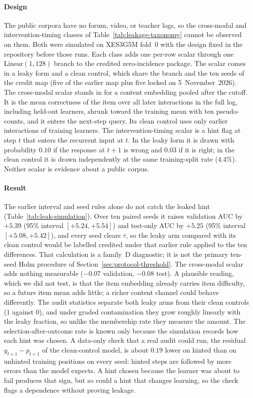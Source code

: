 \documentclass[review,12pt]{elsarticle}
\begin{document}
\paragraph{Design}
The public corpora have no forum, video, or teacher logs, so the
cross-modal and intervention-timing classes of
Table~\ref{tab:leakage-taxonomy} cannot be observed on them. Both were
simulated on XES3G5M fold~0 with the design fixed in the repository
before those runs. Each class adds one per-row scalar through one
$\mathrm{Linear}(1,128)$ branch to the credited zero-incidence package.
The scalar comes in a leaky form and a clean control, which share the
branch and the ten seeds of the credit map (five of the earlier map
plus five locked on 5~November~2026). The cross-modal scalar
stands in for a content embedding pooled after the cutoff. It is the
mean correctness of the item over all later interactions in the full
log, including held-out learners, shrunk toward the training mean with
ten pseudo-counts, and it enters the next-step query. Its clean control
uses only earlier interactions of training learners. The
intervention-timing scalar is a hint flag at step $t$ that enters the
recurrent input at $t$. In the leaky form it is drawn with probability
$0.10$ if the response at $t{+}1$ is wrong and $0.03$ if it is right;
in the clean control it is drawn independently at the same
training-split rate ($4.4\%$). Neither scalar is evidence about a
public corpus.

\paragraph{Result}
The earlier interval and seed rules alone do not catch the leaked hint
(Table~\ref{tab:leak-simulation}). Over ten paired seeds it raises
validation AUC by $+5.39$ (95\% interval $[+5.24,+5.54]$) and test-only
AUC by $+5.25$ (95\% interval $[+5.08,+5.42]$), and every seed clears
$\tau$, so the leaky arm compared with its clean control would be
labelled credited under that earlier rule applied to the ten
differences. That calculation is a family~D diagnostic; it is not the
primary ten-seed Holm procedure of Section~\ref{sec:protocol-threshold}. The cross-modal scalar adds
nothing measurable ($-0.07$ validation, $-0.08$ test). A plausible
reading, which we did not test, is that the item embedding already
carries item difficulty, so a future item mean adds little; a richer
content channel could behave differently. The audit statistics separate
both leaky arms from their clean controls ($1$ against $0$), and under graded
contamination they grow roughly linearly with the leaky fraction, so
unlike the membership rate they measure the amount. The selection-after-outcome
rate is known only because the simulation records how each hint was
chosen. A data-only check that a real audit could run, the residual
$y_{t+1}-p_{t+1}$ of the clean-control model, is about $0.19$ lower on
hinted than on unhinted training positions on every seed: hinted steps
are followed by more errors than the model expects. A hint chosen
because the learner was about to fail produces that sign, but so could
a hint that changes learning, so the check flags a dependence without
proving leakage.
\end{document}
